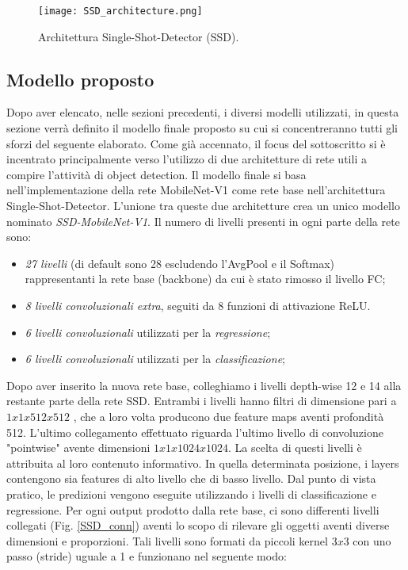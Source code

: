 \begin{figure}
    \centering
    \texttt{[image: SSD\_architecture.png]}
    \centering
    \caption{Architettura Single-Shot-Detector (SSD).}
    \label{SSD_Arch}
\end{figure}

\subsection{Modello proposto}
Dopo aver elencato, nelle sezioni precedenti, i diversi modelli utilizzati, in questa sezione verrà definito il modello finale proposto su cui si concentreranno tutti gli sforzi del seguente elaborato. Come già accennato, il focus del sottoscritto si è incentrato principalmente verso l'utilizzo di due architetture di rete utili a compire l'attività di object detection. Il modello finale si basa nell'implementazione della rete MobileNet-V1 come rete base nell'architettura Single-Shot-Detector. L'unione tra queste due architetture crea un unico modello nominato \emph{SSD-MobileNet-V1}.
Il numero di livelli presenti in ogni parte della rete sono:
\begin{itemize}
    \item \emph{27 livelli} (di default sono 28 escludendo l'AvgPool e il Softmax) rappresentanti la rete base (backbone) da cui è stato rimosso il livello FC;
    \item \emph{8 livelli convoluzionali extra}, seguiti da 8 funzioni di attivazione ReLU.
    \item \emph{6 livelli convoluzionali} utilizzati per la \emph{regressione};
    \item \emph{6 livelli convoluzionali} utilizzati per la \emph{classificazione};
\end{itemize}
Dopo aver inserito la nuova rete base, colleghiamo i livelli depth-wise 12 e 14 alla restante parte della rete SSD. Entrambi i livelli hanno filtri di dimensione pari a $1x1x512x512$ , che a loro volta producono due feature maps aventi profondità 512. L'ultimo collegamento effettuato riguarda l'ultimo livello di convoluzione "pointwise" avente dimensioni $1x1x1024x1024$.
La scelta di questi livelli è attribuita al loro contenuto informativo. In quella determinata posizione, i layers contengono sia features di alto livello che di basso livello. Dal punto di vista pratico, le predizioni vengono eseguite utilizzando i livelli di classificazione e regressione. Per ogni output prodotto dalla rete base, ci sono differenti livelli collegati (Fig. \ref{SSD_conn}) aventi lo scopo di rilevare gli oggetti aventi diverse dimensioni e proporzioni. Tali livelli sono formati da piccoli kernel $3x3$ con uno passo (stride) uguale a 1 e funzionano nel seguente modo:
